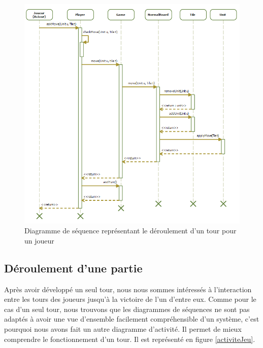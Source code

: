 \begin{figure}[!h] 
\centerline{\includegraphics[width=\textwidth]{img/sequence_tour_ex.png}}
   \caption{\label{étiquette} Diagramme de séquence représentant le déroulement d'un tour pour un joueur}
\label{sequenceTour}
\end{figure}

\subsection{Déroulement d'une partie}
Après avoir développé un seul tour, nous nous sommes intéressés à l'interaction entre les tours des joueurs jusqu'à la victoire de l'un d'entre eux. Comme pour le cas d'un seul tour, nous trouvons que les diagrammes de séquences ne sont pas adaptés à avoir une vue d'ensemble facilement compréhensible d'un système, c'est pourquoi nous avons fait un autre diagramme d'activité. Il permet de mieux comprendre le fonctionnement d'un tour. Il est représenté en figure \ref{activiteJeu}.\\

